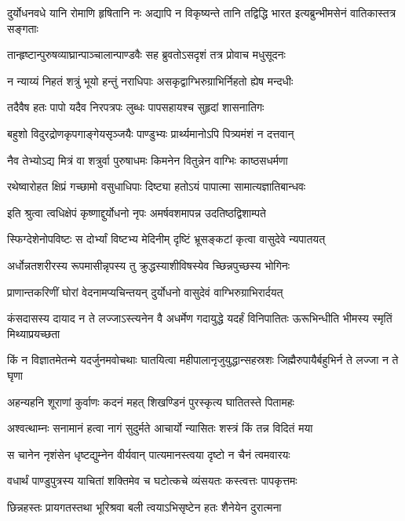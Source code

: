 \threelineshloka
{दुर्योधनवधे यानि रोमाणि हृषितानि नः}
{अद्यापि न विकृष्यन्ते तानि तद्विद्धि भारत}
{इत्यब्रुन्भीमसेनं वातिकास्तत्र सङ्गताः}


\twolineshloka
{तान्हृष्टान्पुरुषव्याघ्रान्पाञ्चालान्पाण्डवैः सह}
{ब्रुवतोऽसदृशं तत्र प्रोवाच मधुसूदनः}


\twolineshloka
{न न्याय्यं निहतं शत्रुं भूयो हन्तुं नराधिपाः}
{असकृद्वाग्भिरुग्राभिर्निहतो ह्येष मन्दधीः}


\twolineshloka
{तदैवैष हतः पापो यदैव निरपत्रपः}
{लुब्धः पापसहायश्च सुहृदां शासनातिगः}


\twolineshloka
{बहुशो विदुरद्रोणकृपगाङ्गेयसृञ्जयैः}
{पाण्डुभ्यः प्रार्थ्यमानोऽपि पित्र्यमंशं न दत्तवान्}


\twolineshloka
{नैव तेभ्योऽद्य मित्रं वा शत्रुर्वा पुरुषाधमः}
{किमनेन वितुन्नेन वाग्भिः काष्ठसधर्मणा}


\twolineshloka
{रथेष्वारोहत क्षिप्रं गच्छामो वसुधाधिपाः}
{दिष्ट्या हतोऽयं पापात्मा सामात्यज्ञातिबान्धवः}


\twolineshloka
{इति श्रुत्वा त्वधिक्षेपं कृष्णाद्दुर्योधनो नृपः}
{अमर्षवशमापन्न उदतिष्ठद्विशाम्पते}


\twolineshloka
{स्फिग्देशेनोपविष्टः स दोर्भ्यां विष्टभ्य मेदिनीम्}
{दृष्टिं भ्रूसङ्कटां कृत्वा वासुदेवे न्यपातयत्}


\twolineshloka
{अर्धोन्नतशरीरस्य रूपमासीन्नृपस्य तु}
{क्रुद्धस्याशीविषस्येव च्छिन्नपुच्छस्य भोगिनः}


\twolineshloka
{प्राणान्तकरिणीं घोरां वेदनामप्यचिन्तयन्}
{दुर्योधनो वासुदेवं वाग्भिरुग्राभिरार्दयत्}


\threelineshloka
{कंसदासस्य दायाद न ते लज्जाऽस्त्यनेन वै}
{अधर्मेण गदायुद्धे यदर्हं विनिपातितः}
{ऊरूभिन्धीति भीमस्य स्मृतिं मिथ्याप्रयच्छता}


\threelineshloka
{किं न विज्ञातमेतन्मे यदर्जुनमवोचथाः}
{घातयित्वा महीपालानृजुयुद्धान्सहस्रशः}
{जिह्मैरुपायैर्बहुभिर्न ते लज्जा न ते घृणा}


\twolineshloka
{अहन्यहनि शूराणां कुर्वाणः कदनं महत्}
{शिखण्डिनं पुरस्कृत्य घातितस्ते पितामहः}


\twolineshloka
{अश्वत्थाम्नः सनामानं हत्वा नागं सुदुर्मते}
{आचार्यो न्यासितः शस्त्रं किं तन्न विदितं मया}


\twolineshloka
{स चानेन नृशंसेन धृष्टद्युम्नेन वीर्यवान्}
{पात्यमानस्त्वया दृष्टो न चैनं त्वमवारयः}


\twolineshloka
{वधार्थं पाण्डुपुत्रस्य याचितां शक्तिमेव च}
{घटोत्कचे व्यंसयतः कस्त्वत्तः पापकृत्तमः}


\twolineshloka
{छिन्नहस्तः प्रायगतस्तथा भूरिश्रवा बली}
{त्वयाऽभिसृष्टेन हतः शैनेयेन दुरात्मना}


